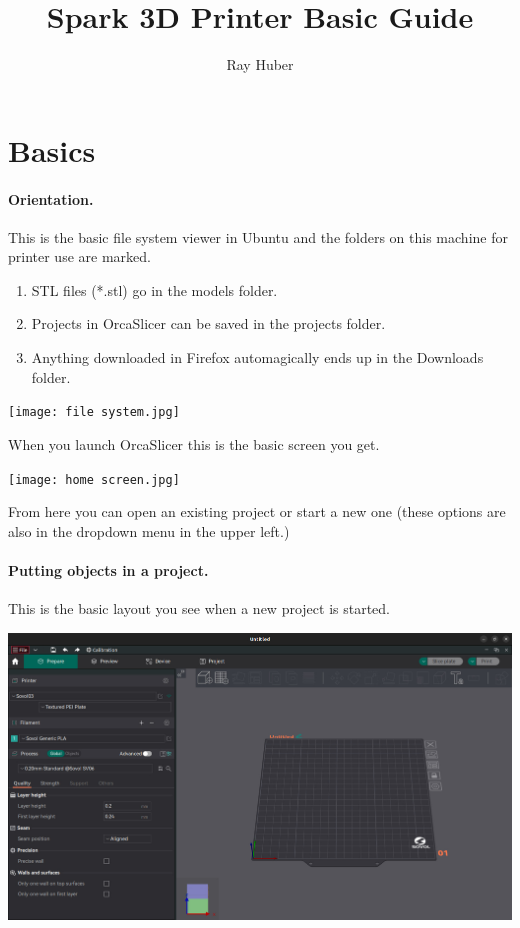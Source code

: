 \documentclass[12pt,legalpaper]{article}
\author{Ray Huber}
\title{Spark 3D Printer Basic Guide}
\begin{document}
\maketitle


\pagebreak

\section{Basics}
\paragraph{Orientation.}
This is the basic file system viewer in Ubuntu and the folders on this machine for printer use are marked.
\begin{enumerate}
    \item STL files (*.stl) go in the models folder.
    \item Projects in OrcaSlicer can be saved in the projects folder.
    \item Anything downloaded in Firefox automagically ends up in the Downloads folder.
\end{enumerate}
\texttt{[image: file system.jpg]}

When you launch OrcaSlicer this is the basic screen you get.

\texttt{[image: home screen.jpg]}

From here you can open an existing project or start a new one (these options are also in the dropdown menu in the upper left.)

\paragraph{Putting objects in a project.}

This is the basic layout you see when a new project is started.

\includegraphics*{empty.jpg}
\end{document}
